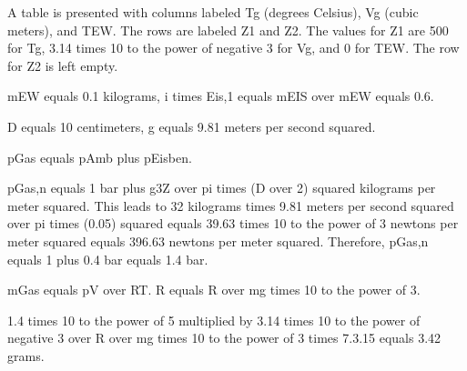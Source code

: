 A table is presented with columns labeled Tg (degrees Celsius), Vg (cubic meters), and TEW. The rows are labeled Z1 and Z2. The values for Z1 are 500 for Tg, 3.14 times 10 to the power of negative 3 for Vg, and 0 for TEW. The row for Z2 is left empty.

mEW equals 0.1 kilograms, i times Eis,1 equals mEIS over mEW equals 0.6.

D equals 10 centimeters, g equals 9.81 meters per second squared.

pGas equals pAmb plus pEisben.

pGas,n equals 1 bar plus g3Z over pi times (D over 2) squared kilograms per meter squared. This leads to 32 kilograms times 9.81 meters per second squared over pi times (0.05) squared equals 39.63 times 10 to the power of 3 newtons per meter squared equals 396.63 newtons per meter squared. Therefore, pGas,n equals 1 plus 0.4 bar equals 1.4 bar.

mGas equals pV over RT. R equals R over mg times 10 to the power of 3.

1.4 times 10 to the power of 5 multiplied by 3.14 times 10 to the power of negative 3 over R over mg times 10 to the power of 3 times 7.3.15 equals 3.42 grams.